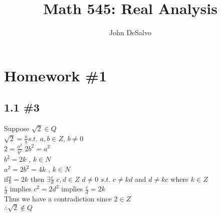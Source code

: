 \documentclass[12pt]{article}
\begin{document}
\pagestyle{plain}

\title{Math 545: Real Analysis}
\author{John DeSalvo}
\maketitle

\tableofcontents

\section{Homework \#1}
\subsection{1.1 \#3}
Suppose $\sqrt{2} \in Q$ \\
$\sqrt{2} = \frac{a}{b} s.t.$ $a, b \in Z$, $b \ne 0$ \\
$2 = \frac{a^{2}}{b^{2}}$
$2b^{2} = a^{2}$ \\
$b^{2} = 2k$ , $k \in N$ \\
$a^{2} = 2b^{2} = 4k$ , $k \in N$ \\
if$\frac{a}{b} = 2k$ then $\exists \frac{c}{d}$ $c, d \in Z$ $d \ne 0$ $s.t.$ $c\ne kd$ and $d\ne kc$ where $k \in Z$ \\
$\frac{c}{d}$ implies $c^{2} = 2d^{2}$ implies $\frac{c}{d} = 2k$ \\
Thus we have a contradiction since $2 \in Z$ \\
$\therefore \sqrt{2} \notin Q$
\end{document}
